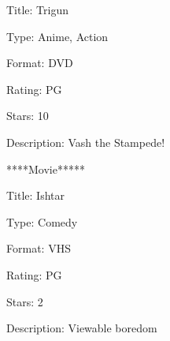 \documentclass{wileySix}
\begin{document}
\begin{myEnumerate}
\begin{myEnumerate}
	\noindent 
	{\fontsize{10pt}{10pt}\selectfont Title: Trigun} \par
	\noindent 
	{\fontsize{10pt}{10pt}\selectfont Type: Anime, Action} \par
	\noindent 
	{\fontsize{10pt}{10pt}\selectfont Format: DVD} \par
	\noindent 
	{\fontsize{10pt}{10pt}\selectfont Rating: PG} \par
	\noindent 
	{\fontsize{10pt}{10pt}\selectfont Stars: 10} \par
	\noindent 
	{\fontsize{10pt}{10pt}\selectfont Description: Vash the Stampede!} \par
	\noindent 
	{\fontsize{10pt}{10pt}\selectfont *****Movie*****} \par
	\noindent 
	{\fontsize{10pt}{10pt}\selectfont Title: Ishtar} \par
	\noindent 
	{\fontsize{10pt}{10pt}\selectfont Type: Comedy} \par
	\noindent 
	{\fontsize{10pt}{10pt}\selectfont Format: VHS} \par
	\noindent 
	{\fontsize{10pt}{10pt}\selectfont Rating: PG} \par
	\noindent 
	{\fontsize{10pt}{10pt}\selectfont Stars: 2} \par
	\noindent 
	{\fontsize{10pt}{10pt}\selectfont Description: Viewable boredom} \par
	\noindent 
	{\fontsize{10pt}{10pt}\selectfont 
			
}
\end{myEnumerate}
\end{myEnumerate}
\end{document}
